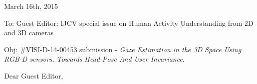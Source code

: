 \documentclass[12pt]{article}
\begin{document}
\begin{center}
\end{center}

\newcommand{\rev}[1]{{\noindent {\bf Comment:} {\it #1}}~\\}
\newcommand{\ans}[1]{{\noindent {\bf Response:} #1}~\\}


\begin{flushleft}
March 16th, 2015
\end{flushleft}

\vspace*{3mm}

\begin{flushleft}
To: Guest Editor: IJCV special issue on Human Activity Understanding from 2D and 3D cameras
\end{flushleft}

\begin{flushleft}
Obj: \#VISI-D-14-00453 submission - {\em Gaze Estimation in the 3D Space Using RGB-D sensors. Towards Head-Pose And User Invariance}.
\end{flushleft}

\vspace*{3mm}

\pagestyle{empty}

\noindent Dear Guest Editor,
\newline
\end{document}
